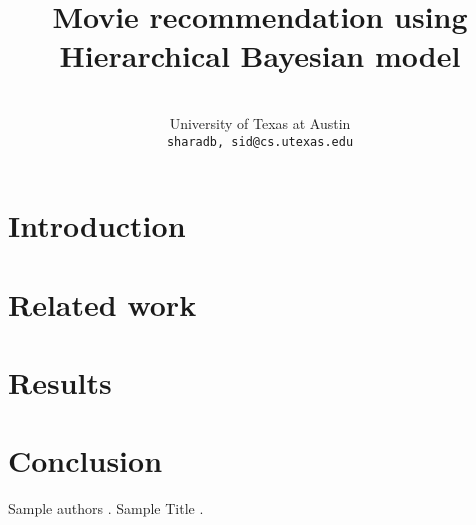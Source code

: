 \documentclass[11pt]{article}
\title{Movie recommendation using Hierarchical Bayesian model}
\author{\\
  University of Texas at Austin\\
  {\tt {sharadb, sid}@cs.utexas.edu} \\}
\date{}
\begin{document}
\maketitle
\begin{abstract}
\end{abstract}

\section{Introduction}

\section{Related work}

\section{Results}


\section{Conclusion}

\begin{thebibliography}{}

Sample authors
.
\newblock Sample Title
.


\end{thebibliography}
\end{document}
